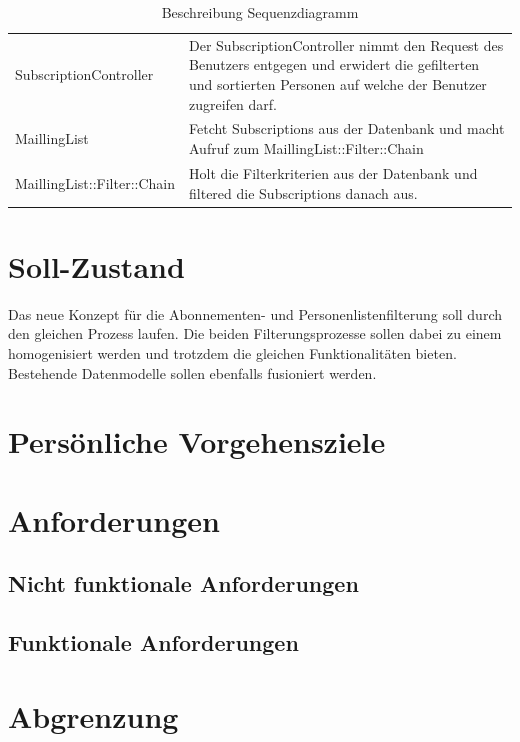 \begin{table}[h!]
   \begin{tabular}{|L{0.4\textwidth}|L{0.5\textwidth}|}
       \hline
         \\[12pt]
       \hline
       SubscriptionController & Der SubscriptionController nimmt den Request des Benutzers entgegen und erwidert die gefilterten und sortierten Personen auf welche der Benutzer zugreifen darf. \\
       \hline
       MaillingList & Fetcht Subscriptions aus der Datenbank und macht Aufruf zum MaillingList::Filter::Chain \\
       \hline
       MaillingList::Filter::Chain & Holt die Filterkriterien aus der Datenbank und filtered die Subscriptions danach aus. \\
       \hline
     \end{tabular}
     \caption{Beschreibung Sequenzdiagramm}
\end{table}

\section{Soll-Zustand}
Das neue Konzept für die Abonnementen- und Personenlistenfilterung soll durch den gleichen Prozess laufen. 
Die beiden Filterungsprozesse sollen dabei zu einem homogenisiert werden und trotzdem die gleichen Funktionalitäten bieten.
Bestehende Datenmodelle sollen ebenfalls fusioniert werden.

\section{Persönliche Vorgehensziele}

\section{Anforderungen}
\subsection{Nicht funktionale Anforderungen}
 
\subsection{Funktionale Anforderungen}

\section{Abgrenzung}
 
